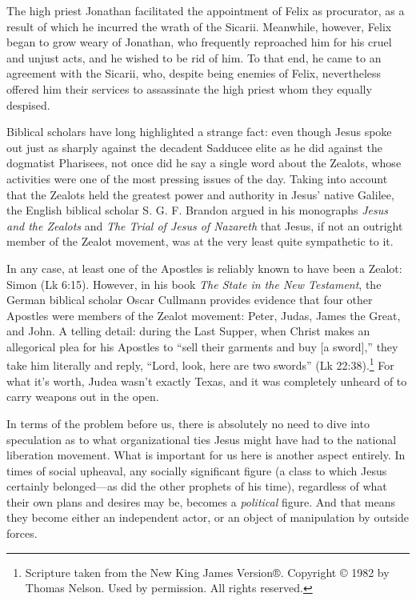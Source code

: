 \begin{smallquote}
    The high priest Jonathan facilitated the appointment of Felix as procurator, as a result of which he incurred the wrath of the Sicarii. Meanwhile, however, Felix began to grow weary of Jonathan, who frequently reproached him for his cruel and unjust acts, and he wished to be rid of him. To that end, he came to an agreement with the Sicarii, who, despite being enemies of Felix, nevertheless offered him their services to assassinate the high priest whom they equally despised.
\end{smallquote}

Biblical scholars have long highlighted a strange fact: even though Jesus spoke out just as sharply against the decadent Sadducee elite as he did against the dogmatist Pharisees, not once did he say a single word about the Zealots, whose activities were one of the most pressing issues of the day. Taking into account that the Zealots held the greatest power and authority in Jesus' native Galilee, the English biblical scholar S. G. F. Brandon argued in his monographs \emph{Jesus and the Zealots} and \emph{The Trial of Jesus of Nazareth} that Jesus, if not an outright member of the Zealot movement, was at the very least quite sympathetic to it.

In any case, at least one of the Apostles is reliably known to have been a Zealot: Simon (Lk 6:15). However, in his book \emph{The State in the New Testament}, the German biblical scholar Oscar Cullmann provides evidence that four other Apostles were members of the Zealot movement: Peter, Judas, James the Great, and John. A telling detail: during the Last Supper, when Christ makes an allegorical plea for his Apostles to ``sell their garments and buy [a sword],'' they take him literally and reply, ``Lord, look, here are two swords'' (Lk 22:38).\footnote{Scripture taken from the New King James Version®. Copyright © 1982 by Thomas Nelson. Used by permission. All rights reserved.} For what it's worth, Judea wasn't exactly Texas, and it was completely unheard of to carry weapons out in the open.

In terms of the problem before us, there is absolutely no need to dive into speculation as to what organizational ties Jesus might have had to the national liberation movement. What is important for us here is another aspect entirely. In times of social upheaval, any socially significant figure (a class to which Jesus certainly belonged---as did the other prophets of his time), regardless of what their own plans and desires may be, becomes a \emph{political} figure. And that means they become either an independent actor, or an object of manipulation by outside forces.